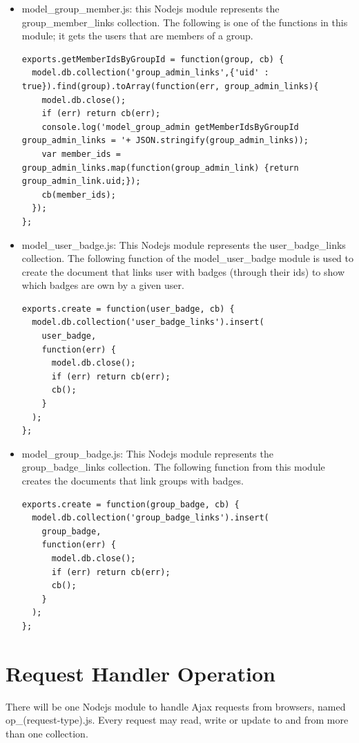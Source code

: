 \begin{itemize}
\item model{\_}group{\_}member.js: this Nodejs module represents the group{\_}member{\_}links collection. The following is one of the functions in this module; it gets the users that are members of a group. 

\begin{lstlisting}
exports.getMemberIdsByGroupId = function(group, cb) {
  model.db.collection('group_admin_links',{'uid' : true}).find(group).toArray(function(err, group_admin_links){
    model.db.close();
    if (err) return cb(err);
    console.log('model_group_admin getMemberIdsByGroupId  group_admin_links = '+ JSON.stringify(group_admin_links));
    var member_ids = group_admin_links.map(function(group_admin_link) {return group_admin_link.uid;});
    cb(member_ids);
  });    
};
\end{lstlisting}
 
\item model{\_}user{\_}badge.js: This Nodejs module represents the user{\_}badge{\_}links collection. The following function of the model{\_}user{\_}badge module is used to create the document that links user with badges (through their ids) to show which badges are own by a given user.

\begin{lstlisting}
exports.create = function(user_badge, cb) {
  model.db.collection('user_badge_links').insert(
    user_badge,
    function(err) {
      model.db.close();
      if (err) return cb(err); 
      cb();
    }
  );
};
\end{lstlisting}

\item model{\_}group{\_}badge.js: This Nodejs module represents the group{\_}badge{\_}links collection. The following function from this module creates the documents that link groups with badges.

\begin{lstlisting}
exports.create = function(group_badge, cb) {
  model.db.collection('group_badge_links').insert(
    group_badge,
    function(err) {
      model.db.close();
      if (err) return cb(err); 
      cb();
    }
  );
};
\end{lstlisting}

\end{itemize}

\section{Request Handler Operation}
There will be one Nodejs module to handle Ajax requests from browsers, named op{\_}(request-type).js. Every request may read, write or update to and from more than one collection.

